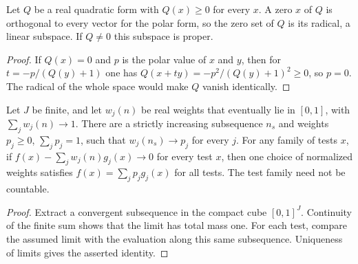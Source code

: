 \begin{lemma}
    \label{lem:perturbations_quadratic_form_radical}
    \leanok
    Let $Q$ be a real quadratic form with $Q(x)\ge0$ for every $x$. A zero $x$
    of $Q$ is orthogonal to every vector for the polar form, so the zero set of
    $Q$ is its radical, a linear subspace. If $Q\neq0$ this subspace is proper.
\end{lemma}
\begin{proof}
    \leanok
    If $Q(x)=0$ and $p$ is the polar value of $x$ and $y$, then for
    $t=-p/(Q(y)+1)$ one has $Q(x+ty)=-p^2/(Q(y)+1)^2\ge0$, so $p=0$. The radical
    of the whole space would make $Q$ vanish identically.
\end{proof}

\begin{lemma}
    \label{thm:finite_convex_weights_compactness}
    \leanok
    Let $J$ be finite, and let $w_j(n)$ be real weights that eventually lie
    in $[0,1]$, with $\sum_jw_j(n)\to1$. There are a strictly increasing
    subsequence $n_s$ and weights $p_j\geq0$, $\sum_jp_j=1$, such that
    $w_j(n_s)\to p_j$ for every $j$.
    For any family of tests $x$, if
    $f(x)-\sum_jw_j(n)g_j(x)\longrightarrow0$ for every test $x$,
    then one choice of normalized weights satisfies
    $f(x)=\sum_jp_jg_j(x)$ for all tests. The test family need not be countable.
\end{lemma}
\begin{proof}\leanok
    Extract a convergent subsequence in the compact cube $[0,1]^J$.
    Continuity of the finite sum shows that the limit has total mass one.
    For each test, compare the assumed limit with the evaluation along
    this same subsequence. Uniqueness of limits gives the asserted identity.
\end{proof}

